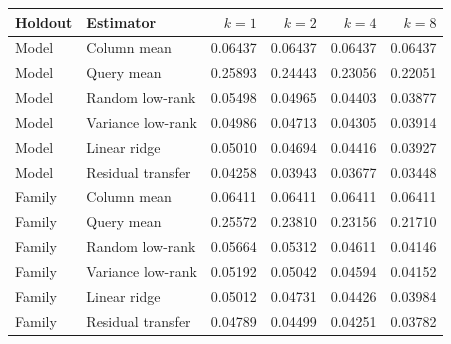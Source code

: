 
\begin{tabular}{llrrrr}
\toprule
Holdout & Estimator & $k=1$ & $k=2$ & $k=4$ & $k=8$ \\
\midrule
Model & Column mean & 0.06437 & 0.06437 & 0.06437 & 0.06437 \\
Model & Query mean & 0.25893 & 0.24443 & 0.23056 & 0.22051 \\
Model & Random low-rank & 0.05498 & 0.04965 & 0.04403 & 0.03877 \\
Model & Variance low-rank & 0.04986 & 0.04713 & 0.04305 & 0.03914 \\
Model & Linear ridge & 0.05010 & 0.04694 & 0.04416 & 0.03927 \\
Model & Residual transfer & 0.04258 & 0.03943 & 0.03677 & 0.03448 \\
\midrule
Family & Column mean & 0.06411 & 0.06411 & 0.06411 & 0.06411 \\
Family & Query mean & 0.25572 & 0.23810 & 0.23156 & 0.21710 \\
Family & Random low-rank & 0.05664 & 0.05312 & 0.04611 & 0.04146 \\
Family & Variance low-rank & 0.05192 & 0.05042 & 0.04594 & 0.04152 \\
Family & Linear ridge & 0.05012 & 0.04731 & 0.04426 & 0.03984 \\
Family & Residual transfer & 0.04789 & 0.04499 & 0.04251 & 0.03782 \\
\bottomrule
\end{tabular}
